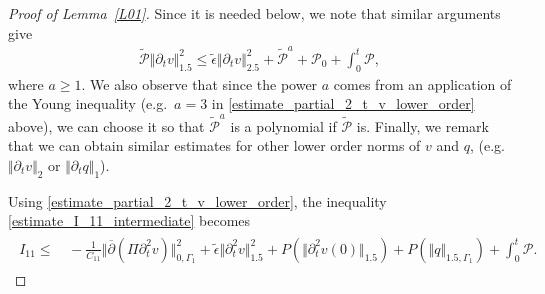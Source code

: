 \documentclass[10pt,reqno]{amsart}
\theoremstyle{plain}
\theoremstyle{definition}
\newtheorem{remark}[theorem]{Remark}
\numberwithin{equation}{section}
\newcommand{\ccP}{\mathscr{P}}
\newcommand{\ccPz}{\mathscr{P}_0}
\newcommand{\Ga}{\Gamma}
\newcommand{\norm}[1]{\Vert#1\Vert}
\def\cPt{{\tilde{\mathcal P}}}
\begin{document}
\begin{proof}[Proof of Lemma~\ref{L01}]
Since it is needed below, we note that similar arguments give
\begin{gather}
\cPt \norm{\partial_t v}^2_{1.5} \leq \widetilde{\epsilon} \norm{\partial_t v}_{2.5}^2 
+ \cPt^a 
+ \ccPz
+   \int_0^t \ccP,
\label{estimate_partial_t_v_lower_order}
\end{gather}
where $a  \geq 1$. We also observe that since 
the power $a$ comes from an application of the 
Young inequality (e.g.~$a=3$ in
\eqref{estimate_partial_2_t_v_lower_order}
above), 
we can 
choose  it so that $\cPt^a$ is a polynomial if $\cPt$ is. Finally, we remark that 
we can obtain similar estimates for other lower order norms  of $v$ and $q$, (e.g.~$\norm{\partial_t v}_2$ or $\norm{\partial_t q}_1$).

Using \eqref{estimate_partial_2_t_v_lower_order}, 
the inequality \eqref{estimate_I_11_intermediate} becomes
\begin{align}
\begin{split}
I_{11}  \leq  & \, - \frac{1}{C_{11}} \norm{ \overline{\partial} (\Pi \partial^2_t v)}^2_{0,\Ga_1}
+ \widetilde{\epsilon} \norm{ \partial^2_t v}_{1.5}^2 
+P(\norm{  \partial^2_t v(0)}_{1.5})
+P(\norm{q}_{1.5,\Ga_1}) 
+   \int_0^t \ccP
.
\end{split}
\label{estimate_I_11}
\end{align}


\end{proof}
\end{document}
